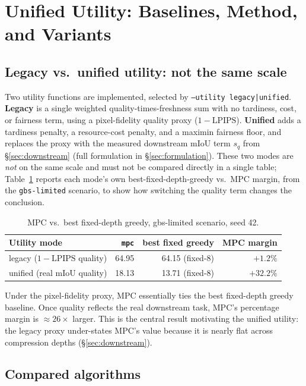 \section{Unified Utility: Baselines, Method, and Variants}
\label{sec:utility-results}

\subsection{Legacy vs.\ unified utility: not the same scale}

Two utility functions are implemented, selected by \texttt{--utility
legacy|unified}. \textbf{Legacy} is a single weighted quality-times-freshness
sum with no tardiness, cost, or fairness term, using a pixel-fidelity
quality proxy ($1-\text{LPIPS}$). \textbf{Unified} adds a tardiness penalty,
a resource-cost penalty, and a maximin fairness floor, and replaces the
proxy with the measured downstream mIoU term $s_q$ from
\S\ref{sec:downstream} (full formulation in \S\ref{sec:formulation}). These
two modes are \emph{not} on the same scale and must not be compared directly
in a single table; Table~\ref{tab:legacy-vs-unified} reports each mode's
own best-fixed-depth-greedy vs.\ MPC margin, from the \texttt{gbs-limited}
scenario, to show how switching the quality term changes the conclusion.

\begin{table}[h]
\centering
\caption{MPC vs.\ best fixed-depth greedy, gbs-limited scenario, seed 42.}
\label{tab:legacy-vs-unified}
\begin{tabular}{lrrr}
\toprule
Utility mode & \texttt{mpc} & best fixed greedy & MPC margin \\
\midrule
legacy ($1-\text{LPIPS}$ quality) & 64.95 & 64.15 (fixed-8) & $+1.2\%$ \\
unified (real mIoU quality)       & 18.13 & 13.71 (fixed-8) & $+32.2\%$ \\
\bottomrule
\end{tabular}
\end{table}

Under the pixel-fidelity proxy, MPC essentially ties the best fixed-depth
greedy baseline. Once quality reflects the real downstream task, MPC's
percentage margin is $\approx 26\times$ larger. This is the central result
motivating the unified utility: the legacy proxy under-states MPC's value
because it is nearly flat across compression depths (\S\ref{sec:downstream}).

\subsection{Compared algorithms}

